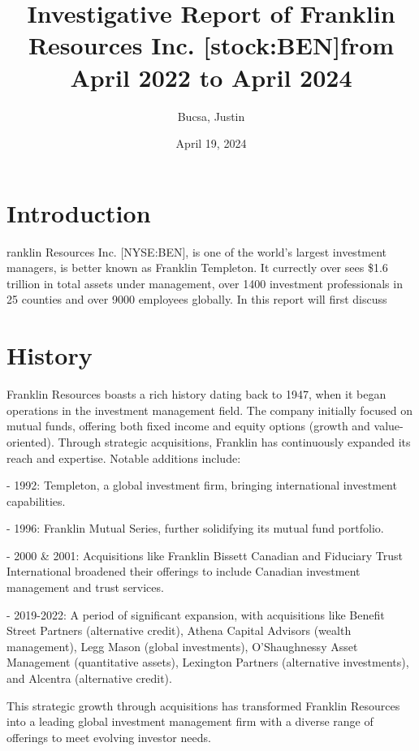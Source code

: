 \documentclass[9pt,a4paper,twoside]{tau}
\title{Investigative Report of Franklin Resources Inc. [stock:BEN]from April 2022 to April 2024}
\author[a,1]{Bucsa, Justin}
\affil[a]{Stealth}
\date{April 19, 2024}
\begin{document}
		
	\maketitle
	\thispagestyle{firststyle}
	\tauabstract
	\tableofcontents


\section{Introduction}

    ranklin Resources Inc. [NYSE:BEN], is one of the world's largest investment managers, is better known as Franklin Templeton. It currectly over sees \$1.6 trillion in total assets under management, over 1400 investment professionals in 25 counties and over 9000 employees globally. In this report will first discuss

\section{History}
    Franklin Resources boasts a rich history dating back to 1947, when it began operations in the investment management field. The company initially focused on mutual funds, offering both fixed income and equity options (growth and value-oriented). Through strategic acquisitions, Franklin has continuously expanded its reach and expertise. Notable additions include:

    - 1992: Templeton, a global investment firm, bringing international investment capabilities.
    
    - 1996: Franklin Mutual Series, further solidifying its mutual fund portfolio.

    - 2000 \& 2001: Acquisitions like Franklin Bissett Canadian and Fiduciary Trust International broadened their offerings to include Canadian investment management and trust services.
    
    - 2019-2022: A period of significant expansion, with acquisitions like Benefit Street Partners (alternative credit), Athena Capital Advisors (wealth management), Legg Mason (global investments), O’Shaughnessy Asset Management (quantitative assets), Lexington Partners (alternative investments), and Alcentra (alternative credit).
    
    This strategic growth through acquisitions has transformed Franklin Resources into a leading global investment management firm with a diverse range of offerings to meet evolving investor needs.
    
\end{document}
